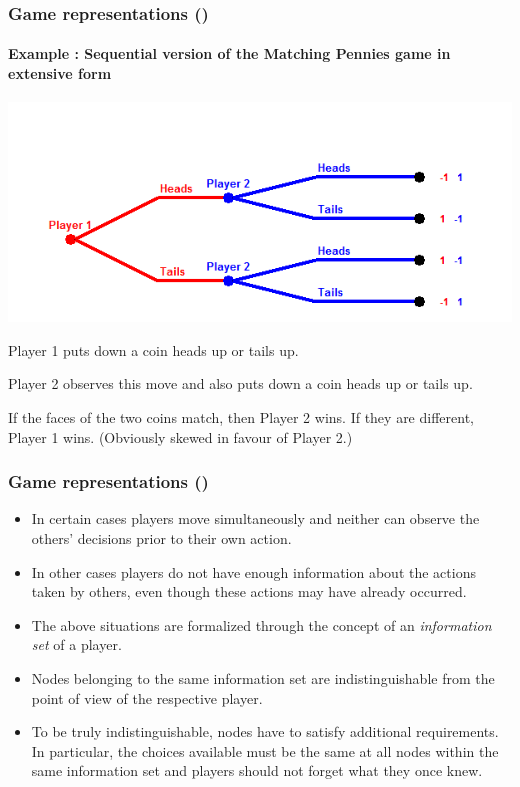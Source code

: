 \documentclass[10pt]{beamer}
\theoremstyle{definition}
\begin{document}
\begin{frame}[fragile]
\frametitle{Game representations ()}
\framesubtitle{Example : Sequential version of the Matching Pennies game in extensive form}
\begin{center}
\includegraphics[width=0.8\linewidth]{Sequential_Matching_Pennies}
\end{center}

\begin{itemize}{\small
\item Player 1 puts down a coin heads up or tails up.
\item Player 2 observes this move and also puts down a coin heads up or tails up.
\item If the faces of the two coins match, then Player 2 wins. If they are different, Player 1 wins. (Obviously skewed in favour of Player 2.)}
\end{itemize}
\end{frame}



\begin{frame}[fragile]
\frametitle{Game representations ()}
\begin{itemize}\itemsep1em
\item In certain cases players move simultaneously and neither can observe the others' decisions prior to their own action.
\item In other cases players do not have enough information about the actions taken by others, even though these actions may have already occurred.
\item The above situations are formalized through the concept of an \emph{information set} of a player.
\item Nodes belonging to the same information set are indistinguishable from the point of view of the respective player.
\item To be truly indistinguishable, nodes have to satisfy additional requirements. In particular, the choices available must be the same at all nodes within the same information set and players should not forget what they once knew.
\end{itemize}
\end{frame}
\end{document}
